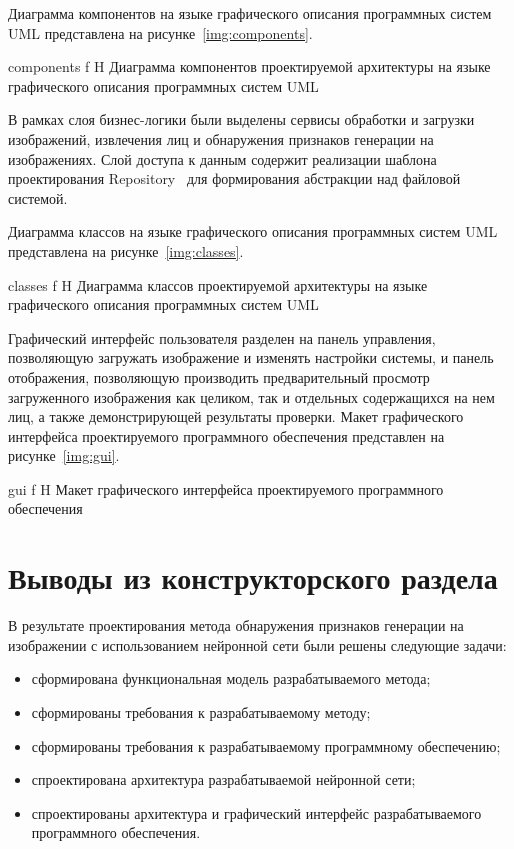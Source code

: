 \newpage

Диаграмма компонентов на языке графического описания программных систем UML представлена на рисунке~\ref{img:components}.

{components}
{f} %
{H}
{\textwidth} %
{Диаграмма компонентов проектируемой архитектуры на языке графического описания программных систем UML}

В рамках слоя бизнес-логики были выделены сервисы обработки и загрузки изображений, извлечения лиц и обнаружения признаков генерации на изображениях. Слой доступа к данным содержит реализации шаблона проектирования Repository~\cite{patterns} для формирования абстракции над файловой системой.

\newpage

Диаграмма классов на языке графического описания программных систем UML представлена на рисунке~\ref{img:classes}.

{classes}
{f} %
{H}
{\textwidth} %
{Диаграмма классов проектируемой архитектуры на языке графического описания программных систем UML}

Графический интерфейс пользователя разделен на панель управления, позволяющую загружать изображение и изменять настройки системы, и панель отображения, позволяющую производить предварительный просмотр загруженного изображения как целиком, так и отдельных содержащихся на нем лиц, а также демонстрирующей результаты проверки. Макет графического интерфейса проектируемого программного обеспечения представлен на рисунке~\ref{img:gui}.

{gui}
{f} %
{H}
{\textwidth} %
{Макет графического интерфейса проектируемого программного обеспечения}

\section{Выводы из конструкторского раздела}

В результате проектирования метода обнаружения признаков генерации на изображении с использованием нейронной сети были решены следующие задачи:
\begin{itemize}
	\item сформирована функциональная модель разрабатываемого метода;
	\item сформированы требования к разрабатываемому методу;
	\item сформированы требования к разрабатываемому программному обеспечению;
	\item спроектирована архитектура разрабатываемой нейронной сети;
	\item спроектированы архитектура и графический интерфейс разрабатываемого программного обеспечения.
\end{itemize}
